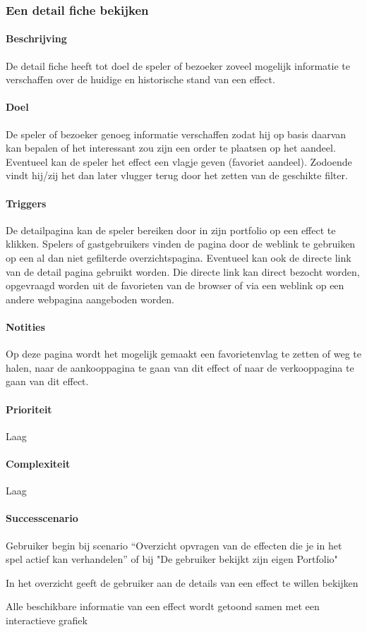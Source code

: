 \subsubsection{Een detail fiche bekijken}
\begin{compact}
\paragraph{Beschrijving} De detail fiche heeft tot doel de speler of bezoeker zoveel mogelijk informatie te verschaffen over de huidige en historische stand van een effect.
\paragraph{Doel} De speler of bezoeker genoeg informatie verschaffen zodat hij op basis daarvan kan bepalen of het interessant zou zijn een order te plaatsen op het aandeel. Eventueel kan de speler het effect een vlagje geven (favoriet aandeel). Zodoende vindt hij/zij het dan later vlugger terug door het zetten van de geschikte filter.
\paragraph{Triggers} De detailpagina kan de speler bereiken door in zijn portfolio op een effect te klikken. Spelers of gastgebruikers vinden de pagina door de weblink te gebruiken op een al dan niet gefilterde overzichtspagina. Eventueel kan ook de directe link van de detail pagina gebruikt worden. Die directe link kan direct bezocht worden, opgevraagd worden uit de favorieten van de browser of via een weblink op een andere webpagina aangeboden worden.
\paragraph{Notities} Op deze pagina wordt het mogelijk gemaakt een favorietenvlag te zetten of weg te halen, naar de aankooppagina te gaan van dit effect of naar de verkooppagina te gaan van dit effect.
\paragraph{Prioriteit}Laag
\paragraph{Complexiteit}Laag
\paragraph{Successcenario}
\begin{enumerate_compact}
 \item Gebruiker begin bij scenario ``Overzicht opvragen van de effecten die je in het spel actief kan verhandelen'' of bij "De gebruiker bekijkt zijn eigen Portfolio"
 \item In het overzicht geeft de gebruiker aan de details van een effect te willen bekijken
 \item Alle beschikbare informatie van een effect wordt getoond samen met een interactieve grafiek
\end{enumerate_compact}
\end{compact}

